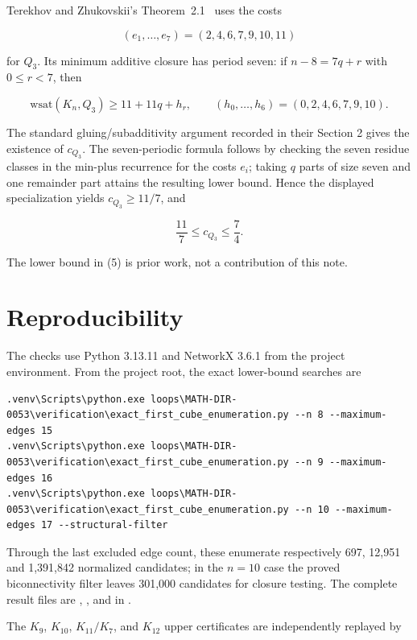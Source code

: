 \documentclass[11pt]{article}
\numberwithin{equation}{section}
\begin{document}
Terekhov and Zhukovskii's Theorem~2.1~\cite{tz-combinatorial} uses the costs

\[
(e_1,\ldots,e_7)=(2,4,6,7,9,10,11)
\]

for $Q_3$. Its minimum additive closure has period seven: if $n-8=7q+r$ with
$0\leq r<7$, then

\[
\mathrm{wsat}(K_n,Q_3)\geq11+11q+h_r,
\qquad(h_0,\ldots,h_6)=(0,2,4,6,7,9,10).
\]

The standard gluing/subadditivity argument recorded in their Section 2 gives the existence of
$c_{Q_3}$. The seven-periodic formula follows by checking the seven residue classes in the
min-plus recurrence for the costs $e_i$; taking $q$ parts of size seven and one remainder part
attains the resulting lower bound. Hence the displayed specialization yields
$c_{Q_3}\geq11/7$, and

\[
\frac{11}{7}\leq c_{Q_3}\leq\frac74.
\tag{5}
\]

The lower bound in (5) is prior work, not a contribution of this note.

\section{Reproducibility}


The checks use Python 3.13.11 and NetworkX 3.6.1 from the project environment. From the project
root, the exact lower-bound searches are

\begin{Verbatim}[fontsize=\scriptsize,breaklines=true,breakanywhere=true]
.venv\Scripts\python.exe loops\MATH-DIR-0053\verification\exact_first_cube_enumeration.py --n 8 --maximum-edges 15
.venv\Scripts\python.exe loops\MATH-DIR-0053\verification\exact_first_cube_enumeration.py --n 9 --maximum-edges 16
.venv\Scripts\python.exe loops\MATH-DIR-0053\verification\exact_first_cube_enumeration.py --n 10 --maximum-edges 17 --structural-filter
\end{Verbatim}


Through the last excluded edge count, these enumerate respectively 697, 12,951 and 1,391,842
normalized candidates; in the $n=10$ case the proved biconnectivity filter leaves 301,000 candidates
for closure testing. The complete result files are {\small{}},
{\small{}}, and {\small{}} in
{\small{}}.

The $K_9$, $K_{10}$, $K_{11}/K_7$, and $K_{12}$ upper certificates are independently replayed by
\end{document}
